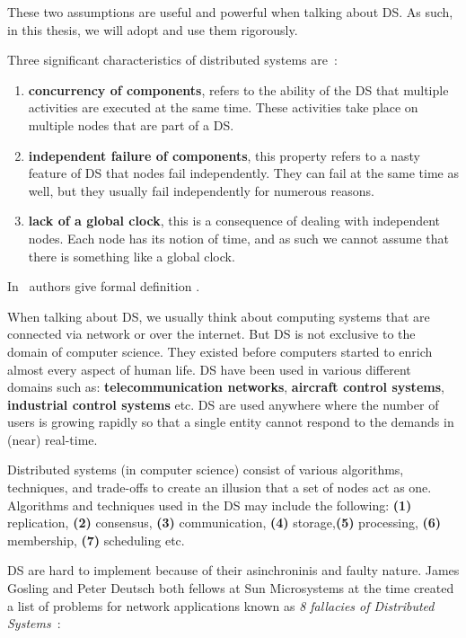 \noindent
These two assumptions are useful and powerful when talking about DS. As such, in this thesis, we will adopt and use them rigorously.

Three significant characteristics of distributed systems are~\cite{0019513}: 

\begin{enumerate}[start=1,label={(\bfseries \arabic*)}]
	\item \textbf{concurrency of components}, refers to the ability of the DS that multiple activities are executed at the same time. These activities take place on multiple nodes that are part of a DS.
	\item \textbf{independent failure of components}, this property refers to a nasty feature of DS that nodes fail independently. They can fail at the same time as well, but they usually fail independently for numerous reasons.
	\item \textbf{lack of a global clock}, this is a consequence of dealing with independent nodes. Each node has its notion of time, and as such we cannot assume that there is something like a global clock.
\end{enumerate} 

\noindent
In~\cite{SteenT16} authors give formal definition .

When talking about DS, we usually think about computing systems that are connected via network or over the internet. But DS is not exclusive to the domain of computer science. They existed before computers started to enrich almost every aspect of human life. DS have been used in various different domains such as: \textbf{telecommunication networks}, \textbf{aircraft control systems}, \textbf{industrial control systems} etc. DS are used anywhere where the number of users is growing rapidly so that a single entity cannot respond to the demands in (near) real-time.

Distributed systems (in computer science) consist of various algorithms, techniques, and trade-offs to create an illusion that a set of nodes act as one. Algorithms and techniques used in the DS may include the following: \textbf{(1)} replication, \textbf{(2)} consensus, \textbf{(3)} communication, \textbf{(4)} storage,\textbf{(5)} processing, \textbf{(6)} membership, \textbf{(7)} scheduling etc.

DS are hard to implement because of their asinchroninis and faulty nature. James Gosling and Peter Deutsch both fellows at Sun Microsystems at the time created a list of problems for network applications known as \textit{8 fallacies of Distributed Systems}~\cite{articleRotem}:\label{enum:fallacies}

